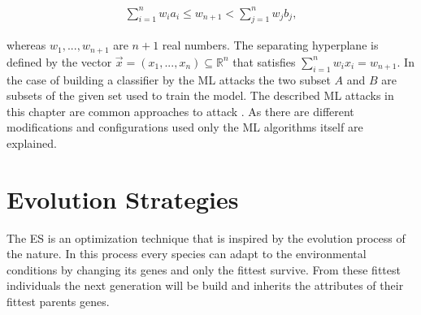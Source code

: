 \begin{align}
\sum_{i=1}^{n} w_i a_i \le w_{n + 1} < \sum_{j=1}^{n} w_j b_j, \label{equ:linearseparable}
\end{align}

whereas $w_1, ..., w_{n + 1}$ are $n + 1$ real numbers.
The separating hyperplane is defined by the vector $\vec{x} = (x_1, ..., x_n) \subseteq \mathbb{R}^n$ that satisfies $\sum_{i = 1}^{n} w_i x_i = w_{n + 1}$.%
In the case of building a classifier by the \ac{ML} attacks the two subset $A$ and $B$ are subsets of the given set used to train the model. %
The described \ac{ML} attacks in this chapter are common approaches to attack \pufs \cite{Ruhrmair2014PUFOverview}.
As there are different modifications and configurations used only the \ac{ML} algorithms itself are explained.

% 
% 
% 

\section{Evolution Strategies}
\label{sec:evolutionstrategies}

The \acf{ES} is an optimization technique that is inspired by the evolution process of the nature.
In this process every species can adapt to the environmental conditions by changing its genes and only the fittest survive.
From these fittest individuals the next generation will be build and inherits the attributes of their fittest parents genes. %

